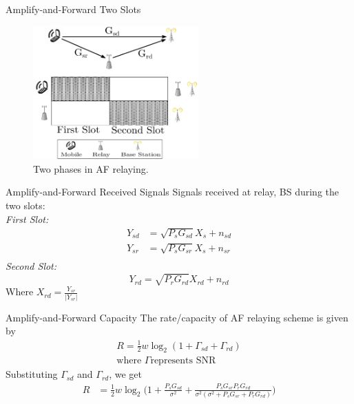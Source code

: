 \documentclass{beamer}
\begin{document}
\begin{frame}{Amplify-and-Forward } {Two Slots}
\begin{figure}
\centering
\includegraphics[width=2.5in]{../img/sysmodel.eps}
  \caption{Two phases in AF relaying.}
\end{figure}
\end{frame}

\begin{frame}{Amplify-and-Forward} {Received Signals}
\vspace{-1cm}
Signals received at relay, BS during the two slots: \\
	\vspace{1cm}
	\textit{First Slot:}
	\begin{align*} 
			Y_{sd} &= \sqrt{P_s G_{sd}} X_s + n_{sd} \\
			Y_{sr} &= \sqrt{P_s G_{sr}} X_s + n_{sr} \\
	\end{align*}
	\pause
	\textit{Second Slot:}
	\begin{equation*}\label{yrd}
			Y_{rd} = \sqrt{P_r G_{rd}} X_{rd} + n_{rd} 
	\end{equation*}
	Where $X_{rd} = \frac{Y_{sr}}{|Y_{sr}|}$ 
\end{frame}

\begin{frame}{Amplify-and-Forward} {Capacity}
\vspace{-1cm}
The rate/capacity of AF relaying scheme is given by
	\begin{align*}
			R = \frac{1}{2} w \log_2(1+\Gamma_{sd}+\Gamma_{rd}) 
				\\ \text{where $\Gamma$
				represents SNR}
	\end{align*}
	Substituting $\Gamma_{sd}$ and $\Gamma_{rd}$, we get 
	\begin{align*}
			R &= \frac{1}{2} w \log_2\bigg(1+\frac{P_s G_{sd}}{\sigma^2} +
				\frac{P_s G_{sr} P_r G_{rd}}{\sigma^2(\sigma^2 + P_sG_{sr} + P_rG_{rd})}\bigg)
	\end{align*}
\end{frame}
\end{document}
